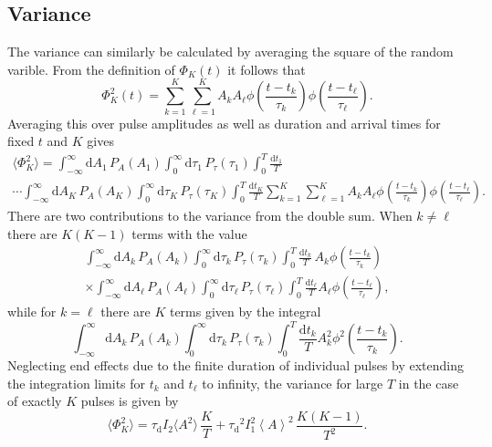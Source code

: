 \documentclass[aps,prb,12pt,a4paper,preprint,amsmath,amssymb,groupedaddress]{revtex4-1}
\newcommand{\ave}[1]{{\left<#1\right>}}
\newcommand{\rmd}{\text{d}}
\newcommand{\taud}{\ensuremath{\tau_\text{d}}}
\begin{document}
\subsection{Variance}



The variance can similarly be calculated by averaging the square of the random varible. From the definition of $\Phi_K(t)$ it follows that
\begin{equation}
\Phi_K^2(t) = \sum_{k=1}^K \sum_{\ell=1}^K A_k A_\ell \phi\left( \frac{t-t_k}{\tau_k} \right)\phi\left( \frac{t-t_\ell}{\tau_\ell} \right) .
\end{equation}
Averaging this over pulse amplitudes as well as duration and arrival times for fixed $t$ and $K$ gives
\begin{multline}
\langle{\Phi_K^2}\rangle = \int_{-\infty}^\infty \rmd A_1\,P_A(A_1) \int_0^\infty \rmd\tau_1\,P_\tau(\tau_1) \int_0^T \frac{\rmd t_1}{T}
\\
\cdots \int_{-\infty}^\infty \rmd A_K\,P_A(A_K) \int_0^\infty \rmd\tau_K\,P_\tau(\tau_K) \int_0^T \frac{\rmd t_K}{T} \sum_{k=1}^K \sum_{\ell=1}^K A_kA_\ell\phi\left( \frac{t-t_k}{\tau_k} \right)\phi\left( \frac{t-t_\ell}{\tau_\ell} \right) .
\end{multline}
There are two contributions to the variance from the double sum. When $k\neq\ell$ there are $K(K-1)$ terms with the value
\begin{multline}
\int_{-\infty}^\infty \rmd A_k\,P_A(A_k) \int_0^\infty \rmd\tau_k\,P_\tau(\tau_k) \int_0^T \frac{\rmd t_k}{T} \,A_k\phi\left( \frac{t-t_k}{\tau_k} \right)
\\
\times \int_{-\infty}^\infty \rmd A_\ell\,P_A(A_\ell) \int_0^\infty \rmd\tau_\ell\,P_\tau(\tau_\ell) \int_0^T \frac{\rmd t_\ell}{T} A_\ell\phi\left( \frac{t-t_\ell}{\tau_\ell} \right) ,
\end{multline}
while for $k=\ell$ there are $K$ terms given by the integral
\begin{equation}
\int_{-\infty}^\infty \rmd A_k\,P_A(A_k) \int_0^\infty \rmd\tau_k\,P_\tau(\tau_k) \int_0^T \frac{\rmd t_k}{T} A_k^2 \phi^2\left( \frac{t-t_k}{\tau_k} \right) .
\end{equation}
Neglecting end effects due to the finite duration of individual pulses by extending the integration limits for $t_k$ and $t_\ell$ to infinity, the variance for large $T$ in the case of exactly $K$ pulses is given by
\begin{equation}
\langle{\Phi_K^2}\rangle = \taud I_2 \langle{A^2}\rangle\,\frac{K}{T} + \taud^2 I_1^2 \ave{A}^2\,\frac{K(K-1)}{T^2} .
\end{equation}
\end{document}
